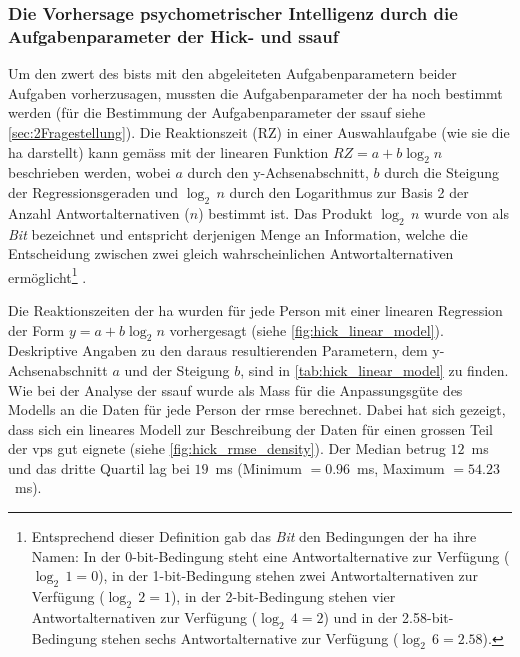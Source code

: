 \documentclass[11pt, twoside, a4paper]{book}		%
\begin{document}









\subsubsection*{Die Vorhersage psychometrischer Intelligenz durch die Aufgabenparameter der Hick- und \gls{ssauf}}

Um den \gls{zwert} des \gls{bist}s mit den abgeleiteten Aufgabenparametern beider Aufgaben vorherzusagen, mussten die Aufgabenparameter der \gls{ha} noch bestimmt werden (für die Bestimmung der Aufgabenparameter der \gls{ssauf} siehe \autoref{sec:2Fragestellung}). 
Die Reaktionszeit (RZ) in einer Auswahlaufgabe (wie sie die \gls{ha} darstellt) kann gemäss \citet[S. 105]{Jensen1987a} mit der linearen Funktion $RZ=a+b\log_{2}n$ beschrieben werden, wobei $a$ durch den y-Ach\-sen\-ab\-schnitt, $b$ durch die Steigung der Regressionsgeraden und $\log_{2}\,n$ durch den Logarithmus zur Basis 2 der Anzahl Antwortalternativen ($n$) bestimmt ist.
Das Produkt $\log_{2}\,n$ wurde von \citet{Hick1952} als \textit{Bit} bezeichnet und entspricht derjenigen Menge an Information, welche die Entscheidung zwischen zwei gleich wahrscheinlichen Antwortalternativen ermöglicht\footnote{Entsprechend dieser Definition gab das \textit{Bit} den Bedingungen der \gls{ha} ihre Namen: In der 0-bit-Bedingung steht eine Antwortalternative zur Verfügung ($\log_{2}\,1=0$), in der 1-bit-Bedingung stehen zwei Antwortalternativen zur Verfügung ($\log_{2}\,2=1$), in der 2-bit-Bedingung stehen vier Antwortalternativen zur Verfügung ($\log_{2}\,4=2$) und in der 2.58-bit-Bedingung stehen sechs Antwortalternative zur Verfügung ($\log_{2}\,6=2.58$).} \citep[siehe auch][S. 27]{Jensen2006}.

Die Reaktionszeiten der \gls{ha} wurden für jede Person mit einer linearen Regression der Form $y=a+b\log_{2}n$  vorhergesagt (siehe \autoref{fig:hick_linear_model}). Deskriptive Angaben zu den daraus resultierenden Parametern, dem y-Ach\-sen\-ab\-schnitt $a$ und der Steigung $b$, sind in \autoref{tab:hick_linear_model} zu finden. Wie bei der Analyse der \gls{ssauf} wurde als Mass für die Anpassungsgüte des Modells an die Daten für jede Person der \gls{rmse} berechnet. Dabei hat sich gezeigt, dass sich ein lineares Modell zur Beschreibung der Daten für einen grossen Teil der \glspl{vp} gut eignete (siehe \autoref{fig:hick_rmse_density}). Der Median betrug $12$~ms und das dritte Quartil lag bei $19$~ms (Minimum $=0.96$~ms, Maximum $=54.23$~ms).
\end{document}
